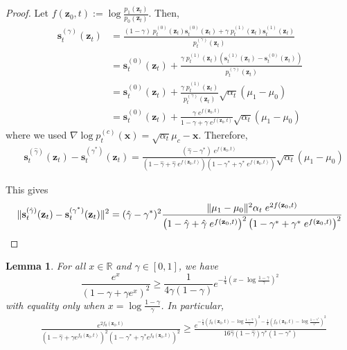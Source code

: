 \documentclass[11pt]{article}
\newcommand{\fitparenth}[1]{\left(#1\right)}
\newcommand{\vect}[1]{\mathbf{#1}}
\newcommand{\RR}{\mathbb{R}}
\theoremstyle{plain}
\newtheorem{lemma}[theorem]{Lemma}
\newcommand{\1}{\mathbbm{1}}
\DeclarePairedDelimiter{\norm}{\lVert}{\rVert}
\newcommand{\vx}{\vect{x}}
\newcommand{\pdist}[2][]{p_{#1}^{(#2)}}
\newcommand{\score}[2][]{\vect{s}_{#1}^{(#2)}}
\begin{document}
\begin{appendices}
\begin{proof}
    Let $f(\vect z_0,t) :=\log \frac{p_1(\vect z_t)}{p_0(\vect z_t)}$. Then,
    \begin{align*}
        \score[t]{\gamma}(\vect z_t)&= \frac{(1-\gamma)\;\pdist[t]{0}(\vect z_t)\score[t]{0}(\vect z_t) + \gamma\;\pdist[t]{1}(\vect z_t)\score[t]{1}(\vect z_t)}{\pdist[t]{\gamma}(\vect z_t)}
        \\
        &=\score[t]{0}(\vect z_t)  +  \frac{  \gamma\;\pdist[t]{1}(\vect z_t)\fitparenth{\score[t]{1}(\vect z_t)-\score[t]{0}(\vect z_t)}}{\pdist[t]{\gamma}(\vect z_t)}
        \\
        &=\score[t]{0}(\vect z_t)  +  \frac{  \gamma\;\pdist[t]{1}(\vect z_t)}{\pdist[t]{\gamma}(\vect z_t)}\sqrt{\alpha_t}\fitparenth{ \mu_1- \mu_0}
        \\
        &=\score[t]{0}(\vect z_t)  +  \frac{  \gamma\;e^{f(\vect z_0,t)}}{1-\gamma+\gamma \; e^{f(\vect z_0,t)}}\sqrt{\alpha_t}\fitparenth{ \mu_1- \mu_0}
    \end{align*}
    where we used $\nabla \log \pdist[t]{c}(\vx) = \sqrt{\alpha_t}\mu_c-\vx$. Therefore,
    \begin{align*}
        &\score[t]{\hat \gamma}(\vect z_t) - \score[t]{\gamma^{*}}(\vect z_t)= \frac{  ({\hat\gamma}-\gamma^*)\;e^{f(\vect z_0,t)}}{\fitparenth{1-{\hat\gamma}+{\hat\gamma} \; e^{f(\vect z_0,t)}}\fitparenth{1-\gamma^*+\gamma^* \; e^{f(\vect z_0,t)}}}\sqrt{\alpha_t}\fitparenth{ \mu_1- \mu_0}
    \end{align*}

    This gives
    \[\norm{\score[t]{\hat \gamma}(\vect z_t) -\score[t]{\gamma^{*}}(\vect z_t)}^2=({\hat\gamma}-\gamma^*)^2\frac{ \norm{ \mu_1- \mu_0}^2\alpha_t\;e^{2f(\vect z_0,t)}}{\fitparenth{1-{\hat\gamma}+{\hat\gamma} \; e^{f(\vect z_0,t)}}^2\fitparenth{1-\gamma^*+\gamma^* \; e^{f(\vect z_0,t)}}^2} \]
\end{proof}

\begin{lemma}
    For all $x\in \RR$ and $\gamma\in [0,1]$, we have 
    \[\frac{e^x}{(1-\gamma + \gamma e^x)^2}\geq \frac{1}{4\gamma (1-\gamma)}e^{-\frac{1}{4}\fitparenth{x-\log \frac{1-\gamma}{\gamma}}^2}\]
    with equality only when $x=\log \frac{1-\gamma}{\gamma}$. In particular, 
    \begin{align*}
        &\frac{e^{2f_0(\vect z_0, t)}}{\fitparenth{1-{\hat\gamma} + {\hat\gamma} e^{f_0(\vect z_0, t)}}^2 \fitparenth{1-\gamma^* + \gamma^* e^{f_0(\vect z_0, t)}}^2}\geq \frac{e^{-\frac{1}{4}\fitparenth{f_0(\vect z_0,t)-\log \frac{1-{\hat\gamma}}{{\hat\gamma}}}^2-\frac{1}{4}\fitparenth{f_0(\vect z_0,t)-\log \frac{1-\gamma^*}{\gamma^*}}^2}}{16 {\hat\gamma} (1-{\hat\gamma}) \gamma^* (1-\gamma^*)}
    \end{align*}
\end{lemma}


\end{appendices}
\end{document}
